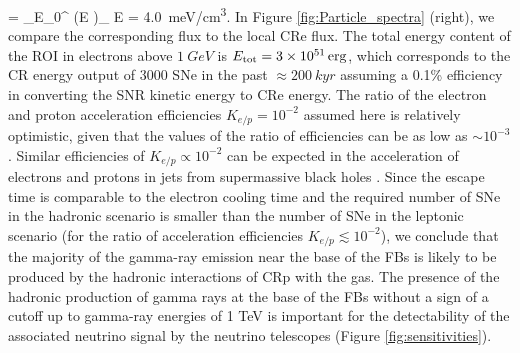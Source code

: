 \be
{} = \int_{E_0}^{\infty} \left(E \right)_{\!\!\el} \de E = \SI{4.0}{meV/cm^3}.
\ee
In Figure \ref{fig:Particle_spectra} (right), we compare the corresponding flux to the local CRe flux.
The total energy content of the ROI in electrons above $\SI{1}{GeV}$ is $E_{\text{tot}} = \SI{3e51}{erg}$, which corresponds to the CR energy output of 3000 SNe in the past $\approx \SI{200}{kyr}$ assuming a 0.1\% efficiency in converting the SNR kinetic energy to CRe energy.
The ratio of the electron and proton acceleration efficiencies $K_{e/p} = 10^{-2}$ assumed here is relatively optimistic,
given that the values of the ratio of efficiencies can be as low as $\sim 10^{-3}$ \citep[e.g.,][]{2015PhRvL.114h5003P}.
Similar efficiencies of $K_{e/p} \propto 10^{-2}$ can be expected in the acceleration of 
electrons and protons in jets from supermassive black holes \citep[e.g.,][]{2018arXiv180305556B}.
Since the escape time is comparable to the electron cooling time and the required number of SNe in the hadronic
scenario is smaller than the number of SNe in the leptonic scenario (for the ratio of acceleration efficiencies $K_{e/p} \lesssim 10^{-2}$),
we conclude that the majority of the gamma-ray emission near the base of the FBs 
is likely to be produced by the hadronic interactions of CRp with the gas.
The presence of the hadronic production of gamma rays at the base of the FBs without a sign of a cutoff up to gamma-ray energies
of 1 TeV is important for the detectability of the associated neutrino signal by the neutrino telescopes (Figure \ref{fig:sensitivities}).

